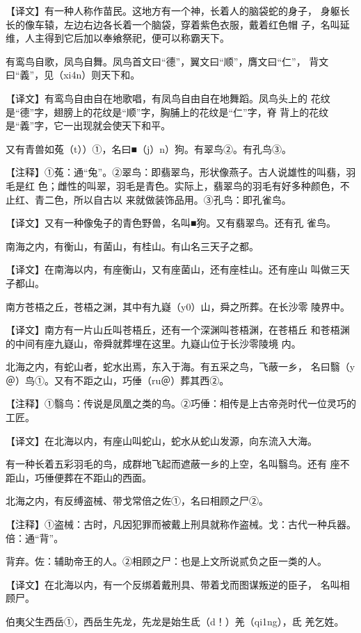 \documentclass[a4paper,12pt,UTF8,twoside]{ctexbook}
\begin{document}
【译文】有一种人称作苗民。这地方有一个神，长着人的脑袋蛇的身子， 身躯长长的像车辕，左边右边各长着一个脑袋，穿着紫色衣服，戴着红色帽 子，名叫延维，人主得到它后加以奉飨祭祀，便可以称霸天下。

有鸾鸟自歌，凤鸟自舞。凤鸟首文曰“德”，翼文曰“顺”，膺文曰“仁”， 背文曰“義”，见（xi4n）则天下和。

【译文】有鸾鸟自由自在地歌唱，有凤鸟自由自在地舞蹈。凤鸟头上的 花纹是“德”字，翅膀上的花纹是“顺”字，胸脯上的花纹是“仁”字，脊 背上的花纹是“義”字，它一出现就会使天下和平。

又有青兽如菟（t））①，名曰■（j）n）狗。有翠鸟②。有孔鸟③。

【注释】①菟：通“兔”。②翠鸟：即翡翠鸟，形状像燕子。古人说雄性的叫翡，羽毛是红 色；雌性的叫翠，羽毛是青色。实际上，翡翠鸟的羽毛有好多种颜色，不止红、青二色，所以自古以 来就做装饰品用。③孔鸟：即孔雀鸟。

【译文】又有一种像兔子的青色野兽，名叫■狗。又有翡翠鸟。还有孔 雀鸟。

南海之内，有衡山，有菌山，有桂山。有山名三天子之都。

【译文】在南海以内，有座衡山，又有座菌山，还有座桂山。还有座山 叫做三天子都山。

南方苍梧之丘，苍梧之渊，其中有九嶷（y0）山，舜之所葬。在长沙零 陵界中。

【译文】南方有一片山丘叫苍梧丘，还有一个深渊叫苍梧渊，在苍梧丘 和苍梧渊的中间有座九嶷山，帝舜就葬埋在这里。九嶷山位于长沙零陵境 内。

北海之内，有蛇山者，蛇水出焉，东入于海。有五采之鸟，飞蔽一乡， 名曰翳（y＠）鸟①。又有不距之山，巧倕（ru＠）葬其西②。

【注释】①翳鸟：传说是凤凰之类的鸟。②巧倕：相传是上古帝尧时代一位灵巧的工匠。

【译文】在北海以内，有座山叫蛇山，蛇水从蛇山发源，向东流入大海。

有一种长着五彩羽毛的鸟，成群地飞起而遮蔽一乡的上空，名叫翳鸟。还有 座不距山，巧倕便葬在不距山的西面。

北海之内，有反缚盗械、带戈常倍之佐①，名曰相顾之尸②。

【注释】①盗械：古时，凡因犯罪而被戴上刑具就称作盗械。戈：古代一种兵器。倍：通“背”。

背弃。佐：辅助帝王的人。②相顾之尸：也是上文所说贰负之臣一类的人。

【译文】在北海以内，有一个反绑着戴刑具、带着戈而图谋叛逆的臣子， 名叫相顾尸。

伯夷父生西岳①，西岳生先龙，先龙是始生氐（d！）羌（qi1ng），氐 羌乞姓。
\end{document}
